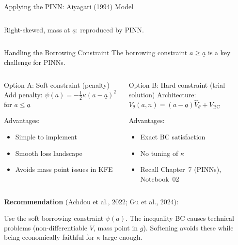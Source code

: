 \documentclass[aspectratio=169,11pt]{beamer}
\newcommand{\emphc}[1]{\textcolor{harvardcrimson}{#1}}
\newcommand{\ubar}[1]{\underline{#1}}
\begin{document}
\begin{frame}[shrink=15]{Applying the PINN: Aiyagari (1994) Model}
\begin{columns}[T]
{\small Right-skewed, mass at $\ubar{a}$: reproduced by PINN.}
\end{columns}
\end{frame}

\begin{frame}{Handling the Borrowing Constraint}
\small
The borrowing constraint $a \geq \ubar{a}$ is a key challenge for PINNs.

\vspace{0.1em}
\begin{columns}[T]
\begin{block}{Option A: Soft constraint (penalty)}
\footnotesize
Add penalty: $\psi(a) = -\tfrac{1}{2}\kappa(a - \ubar{a})^2$ for $a \leq \ubar{a}$

\vspace{0.1em}
Advantages:
\begin{itemize}\itemsep0pt
    \item Simple to implement
    \item Smooth loss landscape
    \item Avoids mass point issues in KFE
\end{itemize}
\end{block}

\begin{block}{Option B: Hard constraint (trial solution)}
\footnotesize
Architecture: $V_\theta(a,n) = (a - \ubar{a})\hat{V}_\theta + V_{\text{BC}}$

\vspace{0.1em}
Advantages:
\begin{itemize}\itemsep0pt
    \item Exact BC satisfaction
    \item No tuning of $\kappa$
    \item Recall Chapter~7 (PINNs), Notebook~02
\end{itemize}
\end{block}
\end{columns}

\vspace{0.1em}
\textbf{Recommendation} (Achdou et al., 2022; Gu et al., 2024):
\begin{center}
\colorbox{uzhgreylight}{\parbox{0.8\textwidth}{\centering\footnotesize
Use the \emphc{soft borrowing constraint} $\psi(a)$. The inequality BC causes technical problems (non-differentiable $V$, mass point in $g$). Softening avoids these while being economically faithful for $\kappa$ large enough.}}
\end{center}
\end{frame}
\end{document}

